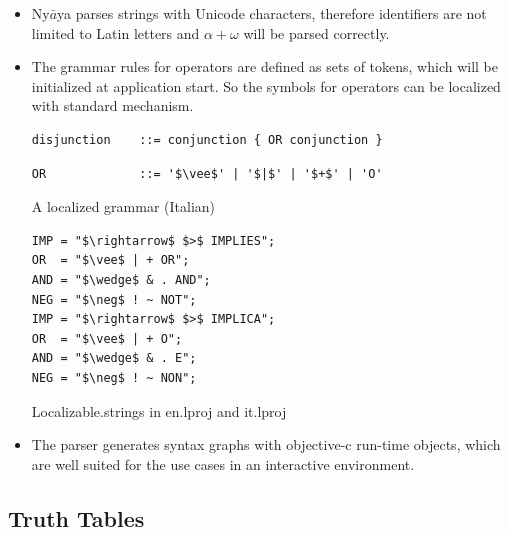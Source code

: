\begin{itemize}

\item Ny$\bar{a}$ya parses strings with Unicode characters, 
therefore identifiers are not limited to Latin letters and
$\alpha + \omega$ will be parsed correctly. 

\item The grammar rules for operators are defined as sets of tokens, 
which will be initialized at application start. So the symbols for operators
can be localized with standard mechanism.

\begin{table}[htdp]
\begin{center}
\begin{lstlisting}[mathescape,firstnumber=7]
disjunction    ::= conjunction { OR conjunction }
\end{lstlisting}
\begin{lstlisting}[mathescape,firstnumber=15]
OR             ::= '$\vee$' | '$|$' | '$+$' | 'O'
\end{lstlisting}
\caption{A localized grammar (Italian)}
\label{tab:LocalizedEBNF}
\end{center}
\end{table}


\begin{table}[htdp]
\begin{center}
\begin{lstlisting}[mathescape,numbers=none,multicols=2]
IMP = "$\rightarrow$ $>$ IMPLIES";
OR  = "$\vee$ | + OR";
AND = "$\wedge$ & . AND";
NEG = "$\neg$ ! ~ NOT";
IMP = "$\rightarrow$ $>$ IMPLICA";
OR  = "$\vee$ | + O";
AND = "$\wedge$ & . E";
NEG = "$\neg$ ! ~ NON";
\end{lstlisting}
\caption{Localizable.strings in en.lproj and it.lproj}
\label{tab:LocalizableStrings}
\end{center}
\end{table}


\item The parser generates syntax graphs with objective-c run-time objects,
which are well suited for the use cases in an interactive environment.

\end{itemize}

\subsection{Truth Tables}

